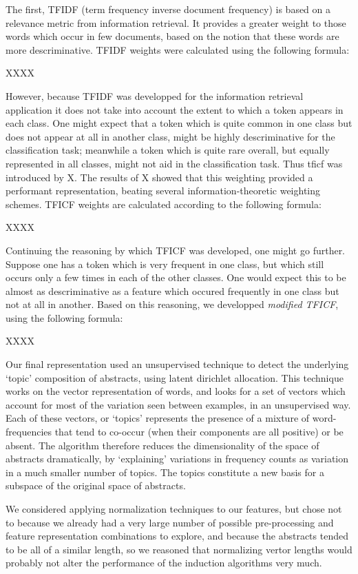 \documentclass[conference,letterpaper]{IEEEtran}
\begin{document}
The first, TFIDF (term frequency inverse document frequency) is based 
on a relevance metric from information retrieval.  It provides a greater 
weight to those words which occur in 
few documents, based on the notion that these words are more descriminative.
TFIDF weights were calculated using the following formula:

XXXX

However, because TFIDF was developped for the information retrieval application
it does not take into account the extent to which a token appears in 
each class.  One might expect that a token which is quite common in one class
but does not appear at all in another class, might be highly descriminative
for the classification task; meanwhile a token which is quite rare overall, 
but equally represented in all classes, might not aid in the classification
task.  Thus tficf was introduced by X.  The results of X showed that 
this weighting provided a performant representation, beating several 
information-theoretic weighting schemes.  TFICF weights are calculated 
according to the following formula:

XXXX

Continuing the reasoning by which TFICF was developed, one might go further.
Suppose one has a token which is very frequent in one class, but which still
occurs only a few times in each of the other classes.  One would expect this
to be almost as descriminative as a feature which occured frequently in one
class but not at all in another.  Based on this reasoning, we developped
\textit{modified TFICF}, using the following formula:

XXXX

Our final representation used an unsupervised technique to detect the
underlying `topic' composition of abstracts, using latent dirichlet allocation.
This technique works on the vector representation of words, and looks for
a set of vectors which account for most of the variation seen between examples,
in an unsupervised way.  Each of these vectors, or `topics' represents the
presence of a mixture of word-frequencies that tend to co-occur (when their
components are all positive) or be absent.  The algorithm therefore reduces
the dimensionality of the space of abstracts dramatically, by `explaining'
variations in frequency counts as variation in a much smaller number of 
topics.  The topics constitute a new basis for a subspace of the original
space of abstracts.

We considered applying normalization techniques to our features, but chose
not to because we already had a very large number of possible pre-processing
and feature representation combinations to explore, and because the abstracts
tended to be all of a similar length, so we reasoned that normalizing vertor 
lengths would probably not alter the performance of the induction algorithms 
very much.
\end{document}
